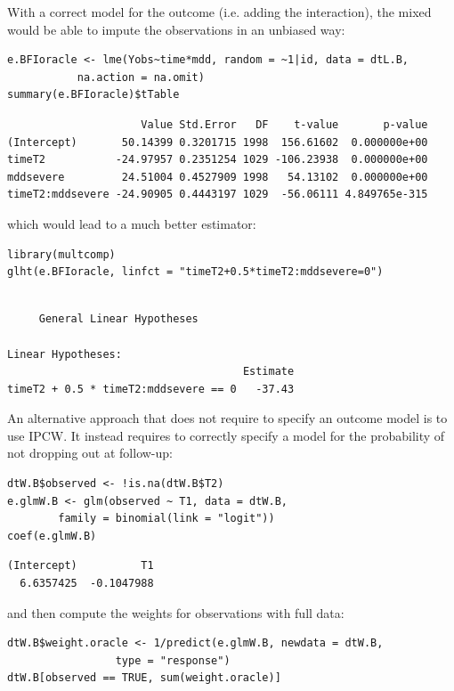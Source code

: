 \documentclass[12pt]{article}
\begin{document}
With a correct model for the outcome (i.e. adding the interaction),
the mixed would be able to impute the observations in an unbiased way:
\lstset{language=r,label= ,caption= ,captionpos=b,numbers=none}
\begin{lstlisting}
e.BFIoracle <- lme(Yobs~time*mdd, random = ~1|id, data = dtL.B,
		   na.action = na.omit)
summary(e.BFIoracle)$tTable
\end{lstlisting}

\begin{verbatim}
                     Value Std.Error   DF    t-value       p-value
(Intercept)       50.14399 0.3201715 1998  156.61602  0.000000e+00
timeT2           -24.97957 0.2351254 1029 -106.23938  0.000000e+00
mddsevere         24.51004 0.4527909 1998   54.13102  0.000000e+00
timeT2:mddsevere -24.90905 0.4443197 1029  -56.06111 4.849765e-315
\end{verbatim}


which would lead to a much better estimator:
\lstset{language=r,label= ,caption= ,captionpos=b,numbers=none}
\begin{lstlisting}
library(multcomp)
glht(e.BFIoracle, linfct = "timeT2+0.5*timeT2:mddsevere=0")
\end{lstlisting}

\begin{verbatim}

	 General Linear Hypotheses

Linear Hypotheses:
                                     Estimate
timeT2 + 0.5 * timeT2:mddsevere == 0   -37.43
\end{verbatim}



\bigskip

An alternative approach that does not require to specify an outcome
model is to use IPCW. It instead requires to correctly specify a model
for the probability of not dropping out at follow-up:
\lstset{language=r,label= ,caption= ,captionpos=b,numbers=none}
\begin{lstlisting}
dtW.B$observed <- !is.na(dtW.B$T2)
e.glmW.B <- glm(observed ~ T1, data = dtW.B,
		family = binomial(link = "logit"))
coef(e.glmW.B)
\end{lstlisting}

\begin{verbatim}
(Intercept)          T1 
  6.6357425  -0.1047988
\end{verbatim}


and then compute the weights for observations with full data:
\lstset{language=r,label= ,caption= ,captionpos=b,numbers=none}
\begin{lstlisting}
dtW.B$weight.oracle <- 1/predict(e.glmW.B, newdata = dtW.B,
				 type = "response")
dtW.B[observed == TRUE, sum(weight.oracle)]
\end{lstlisting}
\end{document}
